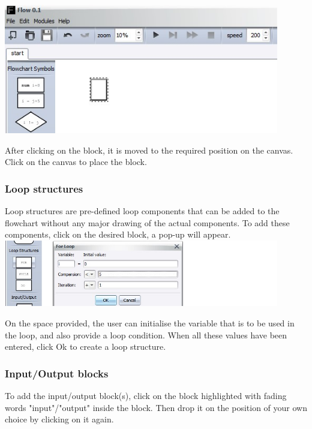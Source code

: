 \documentclass[11pt,a4paper,titlepage]{article}
\begin{document}
	\includegraphics[width=12cm]{images/addBlock.jpg} \newline
	
	After clicking on the block, it is moved to the required position on the canvas. Click on the canvas to place the block.
	
	
	
	\subsubsection{Loop structures}
	
	Loop structures are pre-defined loop components that can be added to the flowchart without any major drawing of the actual components. To add these components, click on the desired block, a pop-up will appear.\\
	
	\includegraphics[width=12cm]{images/loops.jpg} \newline
	
	On the space provided, the user can initialise the variable that is to be used in the loop, and also provide a loop condition. When all these values have been entered, click Ok to create a loop structure.
	
	\subsubsection{Input/Output blocks}	
	
	To add the input/output block(s), click on the block highlighted with fading words "input"/"output" inside the block. Then drop it on the position of your own choice by clicking on it again.\\
	
\end{document}
